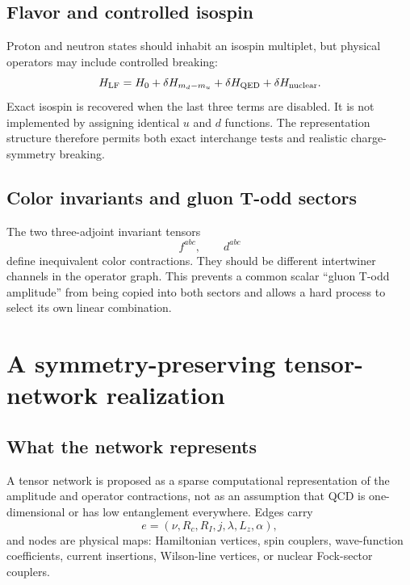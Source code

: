 \documentclass[11pt]{article}
\newcommand{\LF}{\mathrm{LF}}
\begin{document}
\subsection{Flavor and controlled isospin}

Proton and neutron states should inhabit an isospin multiplet, but physical
operators may include controlled breaking:
\begin{equation}
H_{\LF}=H_0+\delta H_{m_d-m_u}+\delta H_{\rm QED}
+\delta H_{\rm nuclear}.
\label{eq:isospin-breaking}
\end{equation}
Exact isospin is recovered when the last three terms are disabled.  It is
not implemented by assigning identical \(u\) and \(d\) functions.  The
representation structure therefore permits both exact interchange tests and
realistic charge-symmetry breaking.

\subsection{Color invariants and gluon T-odd sectors}

The two three-adjoint invariant tensors
\begin{equation}
f^{abc},\qquad d^{abc}
\end{equation}
define inequivalent color contractions.  They should be different
intertwiner channels in the operator graph.  This prevents a common scalar
``gluon T-odd amplitude'' from being copied into both sectors and allows a
hard process to select its own linear combination.

\section{A symmetry-preserving tensor-network realization}

\subsection{What the network represents}

A tensor network is proposed as a sparse computational representation of
the amplitude and operator contractions, not as an assumption that QCD is
one-dimensional or has low entanglement everywhere.  Edges carry
\begin{equation}
e=(\nu,R_c,R_I,j,\lambda,L_z,\alpha),
\label{eq:edge-label}
\end{equation}
and nodes are physical maps: Hamiltonian vertices, spin couplers,
wave-function coefficients, current insertions, Wilson-line vertices, or
nuclear Fock-sector couplers.
\end{document}
